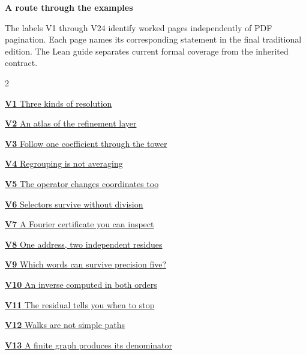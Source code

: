 \documentclass[11pt,a4paper]{article}
\begin{document}
\KomorebiCover
{}


{\sffamily\bfseries\Large\color{accent}A route through the examples}\par\medskip
The labels V1 through V24 identify worked pages independently of PDF
pagination. Each page names its corresponding statement in the final
traditional edition. The Lean guide separates current formal coverage from the inherited contract.
\medskip
\begin{multicols}{2}
{\small\noindent\hyperlink{vpage1}{\textbf{V1} Three kinds of resolution}\par\smallskip}
{\small\noindent\hyperlink{vpage2}{\textbf{V2} An atlas of the refinement layer}\par\smallskip}
{\small\noindent\hyperlink{vpage3}{\textbf{V3} Follow one coefficient through the tower}\par\smallskip}
{\small\noindent\hyperlink{vpage4}{\textbf{V4} Regrouping is not averaging}\par\smallskip}
{\small\noindent\hyperlink{vpage5}{\textbf{V5} The operator changes coordinates too}\par\smallskip}
{\small\noindent\hyperlink{vpage6}{\textbf{V6} Selectors survive without division}\par\smallskip}
{\small\noindent\hyperlink{vpage7}{\textbf{V7} A Fourier certificate you can inspect}\par\smallskip}
{\small\noindent\hyperlink{vpage8}{\textbf{V8} One address, two independent residues}\par\smallskip}
{\small\noindent\hyperlink{vpage9}{\textbf{V9} Which words can survive precision five?}\par\smallskip}
{\small\noindent\hyperlink{vpage10}{\textbf{V10} An inverse computed in both orders}\par\smallskip}
{\small\noindent\hyperlink{vpage11}{\textbf{V11} The residual tells you when to stop}\par\smallskip}
{\small\noindent\hyperlink{vpage12}{\textbf{V12} Walks are not simple paths}\par\smallskip}
{\small\noindent\hyperlink{vpage13}{\textbf{V13} A finite graph produces its denominator}\par\smallskip}

\end{multicols}
\end{document}
